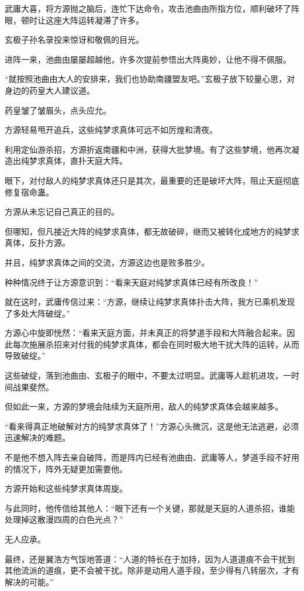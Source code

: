 \begin{this_body}
武庸大喜，将方源抛之脑后，连忙下达命令，攻击池曲由所指方位，顺利破坏了阵眼，顿时让这座大阵运转凝滞了许多。

玄极子孙名录投来惊讶和敬佩的目光。

进阵一来，池曲由屡屡超越他，许多次提前参悟出大阵奥妙，让他不得不佩服。

“就按照池曲由大人的安排来，我们也协助南疆盟友吧。”玄极子放下较量心思，对身边的药皇大人建议道。

药皇皱了皱眉头，点头应允。

方源轻易甩开追兵，这些纯梦求真体可远不如厉煌和清夜。

利用定仙游杀招，方源折返南疆和中洲，获得大批梦境。有了这些梦境，他再次凝造出纯梦求真体，直扑天庭大阵。

眼下，对付敌人的纯梦求真体还只是其次，最重要的还是破坏大阵，阻止天庭彻底修复宿命蛊。

方源从未忘记自己真正的目的。

但哪知，但凡接近大阵的纯梦求真体，都无故破碎，继而又被转化成地方的纯梦求真体，反扑方源。

并且，纯梦求真体之间的交流，方源这边也是败多胜少。

种种情况终于让方源意识到：“看来天庭对纯梦求真体已经有所改良！”

就在这时，武庸传信过来：“方源，继续让纯梦求真体扑击大阵，我方已乘机发现了多处大阵破绽。”

方源心中旋即恍然：“看来天庭方面，并未真正的将梦道手段和大阵融合起来。因此每次施展杀招来对付我的纯梦求真体，都会在同时极大地干扰大阵的运转，从而导致破绽。”

这些破绽，落到池曲由、玄极子的眼中，不要太过明显。武庸等人趁机进攻，一时间战果斐然。

但如此一来，方源的梦境会陆续为天庭所用，敌人的纯梦求真体会越来越多。

“看来得真正地破解对方的纯梦求真体了！”方源心头微沉，这是他无法逃避，必须迅速解决的难题。

不是他不想入阵去亲自破阵，而是阵内已经有池曲由、武庸等人，梦道手段不好用的情况下，阵外无疑更加需要他。

方源开始和这些纯梦求真体周旋。

与此同时，他传信给其他人：“眼下还有一个关键，那就是天庭的人道杀招，谁能处理掉这散漫四周的白色光点？”

无人应承。

最终，还是翼浩方气馁地答道：“人道的特长在于加持，因为人道道痕不会干扰到其他流派的道痕，更不会被干扰。除非是动用人道手段，至少得有八转层次，才有解决的可能。”


\end{this_body}
